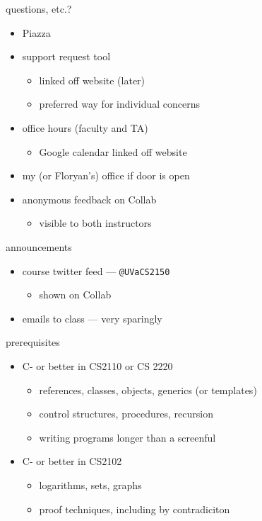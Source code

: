 \begin{frame}{questions, etc.?}
    \begin{itemize}
    \item Piazza 
    \item support request tool
        \begin{itemize}
        \item linked off website (later)
        \item preferred way for individual concerns
        \end{itemize}
    \item office hours (faculty and TA)
        \begin{itemize}
        \item Google calendar linked off website
        \end{itemize}
    \item my (or Floryan's) office if door is open
    \item anonymous feedback on Collab
        \begin{itemize}
        \item visible to both instructors
        \end{itemize}
    \end{itemize}
\end{frame}

\begin{frame}{announcements}
    \begin{itemize}
    \item course twitter feed --- \texttt{@UVaCS2150}
        \begin{itemize}
            \item shown on Collab
        \end{itemize}
    \item emails to class --- very sparingly
    \end{itemize}
\end{frame}

\begin{frame}{prerequisites}
    \begin{itemize}
        \item C- or better in CS2110 or CS 2220
            \begin{itemize}
            \item references, classes, objects, generics (or templates)
            \item control structures, procedures, recursion
            \item writing programs longer than a screenful
            \end{itemize}
        \item C- or better in CS2102
            \begin{itemize}
            \item logarithms, sets, graphs
            \item proof techniques, including by contradiciton
            \end{itemize}
    \end{itemize}
\end{frame}


